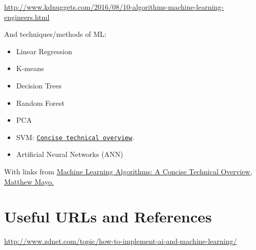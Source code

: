 \documentclass[11pt]{article}
\begin{document}
\smallskip \smallskip
\noindent
\href{http://www.kdnuggets.com/2016/08/10-algorithms-machine-learning-engineers.html}{http://www.kdnuggets.com/2016/08/10-algorithms-machine-learning-engineers.html}


And techniques/methods of ML:
\begin{itemize}
\item{Linear Regression}
\item{K-means} 
\item{Decision Trees}
\item{Random Forest}
\item{PCA}
\item{SVM: 
\href{http://www.kdnuggets.com/2016/09/support-vector-machines-concise-technical-overview.html}{\tt Concise technical overview}. } 
\item{Artificial Neural Networks (ANN)}
\end{itemize}

With links from
\href{https://www.linkedin.com/pulse/machine-learning-algorithms-concise-technical-overview-matthew-mayo}{Machine
Learning Algorithms: A Concise Technical Overview, Matthew Mayo.}


\section{}

\section{Useful URLs and References}
\href{http://www.zdnet.com/topic/how-to-implement-ai-and-machine-learning/}{http://www.zdnet.com/topic/how-to-implement-ai-and-machine-learning/}\\

















\end{document}
